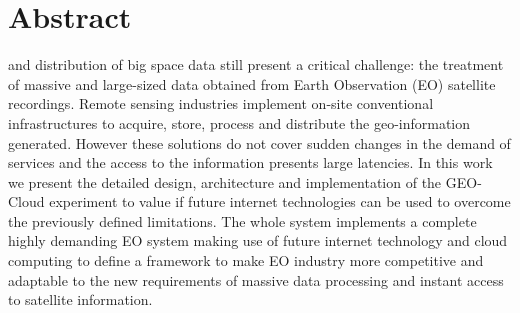 \chapter{Abstract}

 and distribution of big space data still present a critical challenge: the treatment of massive and large-sized data obtained from Earth Observation (EO) satellite recordings. Remote sensing industries implement on-site conventional infrastructures to acquire, store, process and distribute the geo-information generated. However these solutions do not cover sudden changes in the demand of services and the access to the information presents large latencies.
	In this work we present the detailed design, architecture and implementation of the GEO-Cloud experiment to value if future internet technologies can be used to overcome the previously defined limitations.
	The whole system implements a complete highly demanding EO system making use of future internet technology and cloud computing to define a framework to make EO industry more competitive and adaptable to the new requirements of massive data processing and instant access to satellite information.

